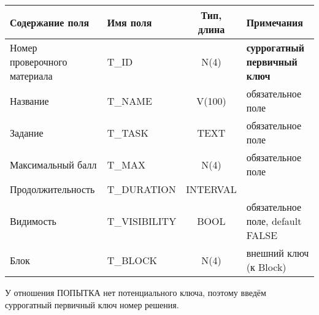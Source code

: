 \documentclass[a4paper,14pt]{article}
\begin{document}
\begin{table}[H]
	\begin{flushleft} 
	\end{flushleft}
\begin{adjustbox}{width=\linewidth}
	\begin{tabular}{|l|l|c|l|}
		\hline
		Содержание поля              & Имя поля     & Тип, длина & Примечания                          \\ \hline
		Номер проверочного материала & T\_ID         &    N(4)    & \textbf{суррогатный первичный ключ} \\ \hline
		Название                     & T\_NAME       &   V(100)   & обязательное поле                   \\ \hline
		Задание                      & T\_TASK       &    TEXT    & обязательное поле                   \\ \hline
		Максимальный балл            & T\_MAX        &    N(4)    & обязательное поле                   \\ \hline
		Продолжительность            & T\_DURATION   &  INTERVAL  &                                     \\ \hline
		Видимость                    & T\_VISIBILITY &    BOOL    & обязательное поле, default FALSE    \\ \hline
		Блок                         & T\_BLOCK      &    N(4)    & внешний ключ (к Block)              \\ \hline
	\end{tabular}
\end{adjustbox}
\end{table}


У отношения ПОПЫТКА нет потенциального ключа, поэтому введём суррогатный первичный ключ номер решения.
\end{document}
